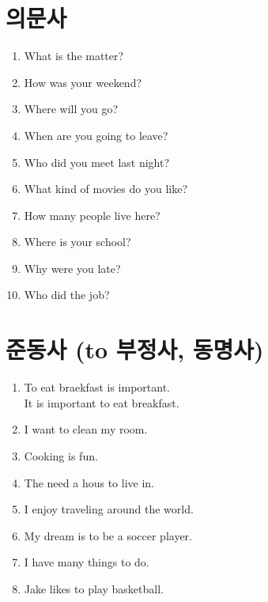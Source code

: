 \documentclass[a4paper, 12pt, twocolumn]{oblivoir}
\begin{document}
    \section{의문사}
    \begin{enumerate}
        \item What is the matter?
        \item How was your weekend?
        \item Where will you go?
        \item When are you going to leave?
        \item Who did you meet last night?
        \item What kind of movies do you like?
        \item How many people live here? 
        \item Where is your school? 
        \item Why were you late? 
        \item Who did the job? 
    \end{enumerate}
    \section{준동사 \normalsize{(to 부정사, 동명사)}} %
    \begin{enumerate}
        \item To eat braekfast is important. \\
              It is important to eat breakfast.
        \item I want to clean my room. 
        \item Cooking is fun. 
        \item The need a hous to live in. 
        \item I enjoy traveling around the world. 
        \item My dream is to be a soccer player. 
        \item I have many things to do. 
        \item Jake likes to play basketball.
    \end{enumerate}
\end{document}

